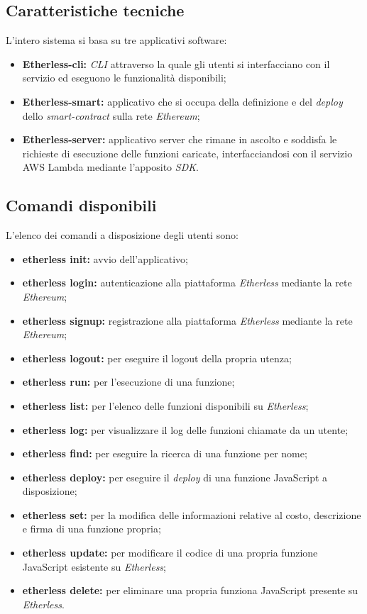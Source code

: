 \subsection{Caratteristiche tecniche}

L'intero sistema si basa su tre applicativi software:
	\begin{itemize}
		\item \textbf{Etherless-cli:} \textit{CLI\glo} attraverso la quale gli utenti si interfacciano con il servizio ed eseguono le funzionalità disponibili;
		\item \textbf{Etherless-smart:} applicativo che si occupa della definizione e del \textit{deploy\glo} dello \textit{smart-contract} sulla rete \textit{Ethereum\glos};
		\item \textbf{Etherless-server:} applicativo server che rimane in ascolto e soddisfa le richieste di esecuzione delle funzioni caricate, interfacciandosi con il servizio AWS Lambda mediante l'apposito \textit{SDK\glos}.
	\end{itemize}

\subsection{Comandi disponibili}
L'elenco dei comandi a disposizione degli utenti sono:
\begin{itemize}
	\item \textbf{etherless init:} avvio dell'applicativo;
	\item \textbf{etherless login:} autenticazione alla piattaforma \textit{Etherless} mediante la rete \textit{Ethereum\glos};
	\item \textbf{etherless signup:} registrazione alla piattaforma \textit{Etherless} mediante la rete \textit{Ethereum\glos};
	\item \textbf{etherless logout:} per eseguire il logout della propria utenza;
	\item \textbf{etherless run:} per l'esecuzione di una funzione;
	\item \textbf{etherless list:} per l'elenco delle funzioni disponibili su \textit{Etherless};
	\item \textbf{etherless log:} per visualizzare il log delle funzioni chiamate da un utente;
	\item \textbf{etherless find:} per eseguire la ricerca di una funzione per nome;
	\item \textbf{etherless deploy\glos:} per eseguire il \textit{deploy\glo} di una funzione JavaScript a disposizione;
	\item \textbf{etherless set:} per la modifica delle informazioni relative al costo, descrizione e firma di una funzione propria;
	\item \textbf{etherless update:} per modificare il codice di una propria funzione JavaScript esistente su \textit{Etherless};
	\item \textbf{etherless delete:} per eliminare una propria funziona JavaScript presente su \textit{Etherless}.
\end{itemize}

